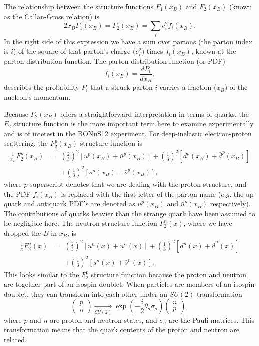 The relationship between the structure functions $F_1(x_B)$ and $F_2(x_B)$ (known as the Callan-Gross relation) is
\begin{equation}
2x_B F_1(x_B) = F_2(x_B) = \sum_i e_i^2 f_i (x_B). 
\end{equation} 
In the right side of this expression we have a sum over partons (the parton index is $i$) of the square of that parton's charge ($e_i^2$) times $f_i(x_B)$, known at the parton distribution function. The parton distribution function (or PDF) 
\begin{equation}
f_i(x_B) = \frac{dP_i}{dx_B},
\end{equation}
describes the probability $P_i$ that a struck parton $i$ carries a fraction ($x_B$) of the nucleon's momentum.

Because $F_2(x_B)$ offers a straightforward interpretation in terms of quarks, the $F_2$ structure function is the more important term here to examine experimentally and is of interest in the BONuS12 experiment. For deep-inelastic electron-proton scattering, the $F_2^p(x_B)$ structure function is
\begin{eqnarray}
\label{eqn:F_p}
\frac{1}{x_B} F_2^p(x_B) &=& \left( \frac{2}{3} \right)^2 [u^p(x_B)+\bar{u}^p(x_B)] + \left( \frac{1}{3} \right)^2 [d^p(x_B)+\bar{d}^p(x_B)] \\
&& + \left( \frac{1}{3} \right)^2 [s^p(x_B)+\bar{s}^p(x_B)],
\end{eqnarray}
where $p$ superscript denotes that we are dealing with the proton structure, and the PDF $f_i(x_B)$ is replaced with the first letter of the parton name ($e.g.$ the up quark and antiquark PDF's are denoted as $u^p(x_B)$ and $\bar{u}^p(x_B)$ respectively). The contributions of quarks heavier than the strange quark have been assumed to be negligible here. The neutron structure function $F_2^n(x)$, where we have dropped the $B$ in $x_B$, is
\begin{eqnarray}
\label{eqn:F_n}
\frac{1}{x} F_2^n(x) &=& \left( \frac{2}{3} \right)^2 [u^n(x)+\bar{u}^n(x)] + \left( \frac{1}{3} \right)^2 [d^n(x)+\bar{d}^n(x)] \\
&& + \left( \frac{1}{3} \right)^2 [s^n(x)+\bar{s}^n(x)].
\end{eqnarray}
This looks similar to the $F_2^p$ structure function because the proton and neutron are together part of an isospin doublet. When particles are members of an isospin doublet, they can transform into each other under an $SU(2)$ transformation
\begin{equation*}
\begin{pmatrix}
p \\ n 
\end{pmatrix}
\xrightarrow[\text{$SU(2)$}]{}
\exp \left( -\frac{i}{2}\theta_a \sigma_a \right)
\begin{pmatrix}
n \\ p
\end{pmatrix},
\end{equation*}
where $p$ and $n$ are proton and neutron states, and $\sigma_a$ are the Pauli matrices. This transformation means that the quark contents of the proton and neutron are related.

